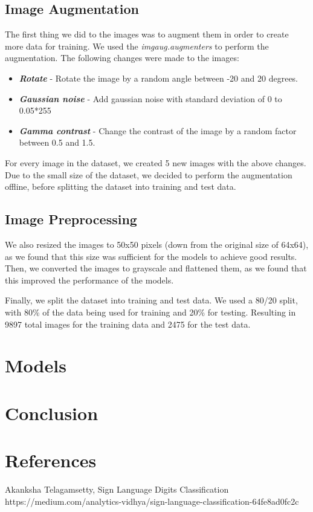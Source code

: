 \documentclass[conference]{IEEEtran}
\begin{document}
\subsection{Image Augmentation}
The first thing we did to the images was to augment them in order to create more data for training. 
We used the \textit{imgaug.augmenters} to perform the augmentation. 
The following changes were made to the images:
\begin{itemize}
    \item \textit{\textbf{Rotate}} - Rotate the image by a random angle between -20 and 20 degrees.
    \item \textit{\textbf{Gaussian noise}} - Add gaussian noise with standard deviation of 0 to 0.05*255
    \item \textit{\textbf{Gamma contrast}} - Change the contrast of the image by a random factor between 0.5 and 1.5.
\end{itemize}
For every image in the dataset, we created 5 new images with the above changes. Due to the small size of the dataset, we decided to perform the augmentation offline, before splitting the dataset into training and test data.

\subsection{Image Preprocessing}
We also resized the images to 50x50 pixels (down from the original size of 64x64), as we found that this size was sufficient for the models to achieve good results. Then, we converted the images to grayscale and flattened them, as we found that this improved the performance of the models.

Finally, we split the dataset into training and test data. We used a 80/20 split, with 80\% of the data being used for training and 20\% for testing.
Resulting in 9897 total images for the training data and 2475 for the test data.
\section{Models}

\section{Conclusion}

\section{References}

\begin{thebibliography}{00}
     Akanksha Telagamsetty, Sign Language Digits Classification https://medium.com/analytics-vidhya/sign-language-classification-64fe8ad0fc2c
\end{thebibliography}
\end{document}

